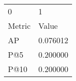 \begin{tabular}{ll}
0 & 1 \\
Metric & Value \\
AP & 0.076012 \\
P@5 & 0.200000 \\
P@10 & 0.200000 \\
\end{tabular}
